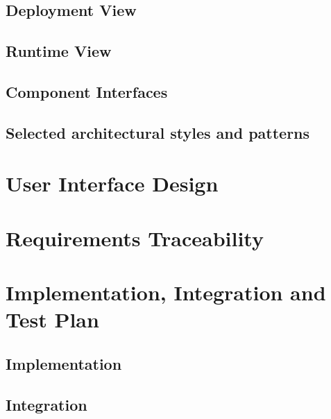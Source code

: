 \documentclass[12pt, a4paper]{report}
\begin{document}
\section{Deployment View}


\section{Runtime View}


\section{Component Interfaces}


\section{Selected architectural styles and patterns}



\chapter{User Interface Design}
\label{ch:user_interface_design}




\chapter{Requirements Traceability}
\label{ch:requirement_traceability}



\chapter{Implementation, Integration and Test Plan}
\label{ch:implementaion_intergrationandtestplan}

\section{Implementation}


\section{Integration}

\end{document}
